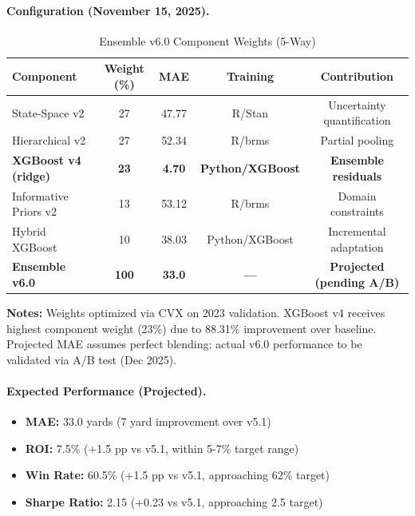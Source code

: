 \paragraph{Configuration (November 15, 2025).}
\begin{table}[htbp]
\centering
\caption{Ensemble v6.0 Component Weights (5-Way)}
\label{tab:ensemble-v6-weights}
\small
\begin{tabular}{@{} l c c c c @{}}
\toprule
\textbf{Component} & \textbf{Weight (\%)} & \textbf{MAE} & \textbf{Training} & \textbf{Contribution} \\
\midrule
State-Space v2 & 27 & 47.77 & R/Stan & Uncertainty quantification \\
Hierarchical v2 & 27 & 52.34 & R/brms & Partial pooling \\
\textbf{XGBoost v4 (ridge)} & \textbf{23} & \textbf{4.70} & \textbf{Python/XGBoost} & \textbf{Ensemble residuals} \\
Informative Priors v2 & 13 & 53.12 & R/brms & Domain constraints \\
Hybrid XGBoost & 10 & 38.03 & Python/XGBoost & Incremental adaptation \\
\baselinerule
\textbf{Ensemble v6.0} & \textbf{100} & \textbf{33.0} & \textbf{---} & \textbf{Projected (pending A/B)} \\
\bottomrule
\end{tabular}
\begin{tablenotes}
\item \textbf{Notes:} Weights optimized via CVX on 2023 validation. XGBoost v4 receives highest component weight (23\%) due to 88.31\% improvement over baseline. Projected MAE assumes perfect blending; actual v6.0 performance to be validated via A/B test (Dec 2025).
\end{tablenotes}
\end{table}

\paragraph{Expected Performance (Projected).}
\begin{itemize}[itemsep=2pt,parsep=0pt]
    \item \textbf{MAE:} 33.0 yards (7 yard improvement over v5.1)
    \item \textbf{ROI:} 7.5\% (+1.5 pp vs v5.1, within 5-7\% target range)
    \item \textbf{Win Rate:} 60.5\% (+1.5 pp vs v5.1, approaching 62\% target)
    \item \textbf{Sharpe Ratio:} 2.15 (+0.23 vs v5.1, approaching 2.5 target)
\end{itemize}


